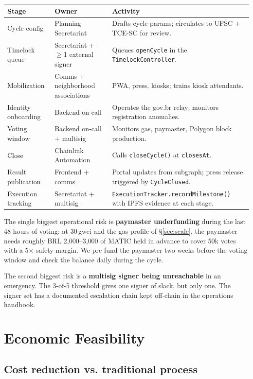 \documentclass[12pt]{article}
\begin{document}
\begin{center}\small
\begin{tabular}{l l p{}}
\toprule
\textbf{Stage} & \textbf{Owner} & \textbf{Activity} \\
\midrule
Cycle config & Planning Secretariat & Drafts cycle params; circulates to UFSC + TCE-SC for review. \\
Timelock queue & Secretariat + \(\geq\)1 external signer & Queues \texttt{openCycle} in the \texttt{TimelockController}. \\
Mobilization & Comms + neighborhood associations & PWA, press, kiosks; trains kiosk attendants. \\
Identity onboarding & Backend on-call & Operates the gov.br relay; monitors registration anomalies. \\
Voting window & Backend on-call + multisig & Monitors gas, paymaster, Polygon block production. \\
Close & Chainlink Automation & Calls \texttt{closeCycle()} at \texttt{closesAt}. \\
Result publication & Frontend + comms & Portal updates from subgraph; press release triggered by \texttt{CycleClosed}. \\
Execution tracking & Secretariat + multisig & \texttt{ExecutionTracker.recordMilestone()} with IPFS evidence at each stage. \\
\bottomrule
\end{tabular}
\end{center}

The single biggest operational risk is \textbf{paymaster underfunding}
during the last 48 hours of voting: at 30\,gwei and the gas profile of
\S\ref{sec:scale}, the paymaster needs roughly BRL 2{,}000--3{,}000 of
MATIC held in advance to cover 50k votes with a 5\(\times\) safety margin.
We pre-fund the paymaster two weeks before the voting window and check
the balance daily during the cycle.

The second biggest risk is a \textbf{multisig signer being unreachable}
in an emergency. The 3-of-5 threshold gives one signer of slack, but only
one. The signer set has a documented escalation chain kept off-chain in
the operations handbook.

\section{Economic Feasibility}
\label{sec:economics}

\subsection{Cost reduction vs. traditional process}
\end{document}

